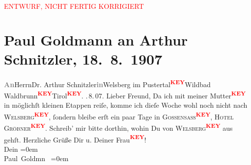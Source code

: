
\begin{center}
            \textcolor{red}{ENTWURF, NICHT FERTIG KORRIGIERT}
                      \end{center}
            
         \renewcommand{\erwaehnteOrte}{Orte: Berlin, Wien}
         \renewcommand{\erwaehnteWerke}{}
               \section[Paul Goldmann an Arthur Schnitzler, 18. 8. 1907]{ Paul Goldmann an Arthur Schnitzler, 18. 8. 1907}\nopagebreak{}\rehead{ }\begin{ledgroupsized}[t]{13cm}\normalsize\beginnumbering \toendnotes[C]{\smallbreak\pagebreak[2]} 
\pstart
           \noindent{}{\pb}\pstart{}\textcolor{gray}{\textbf{ An}}\pend{}\pstart{}Herrn\pend{}\pstart{}Dr. Arthur Schnitzler\pend{}\pstart{}\textcolor{gray}{\textbf{in}}Welsberg im Pustertal\textcolor{red}{\textsuperscript{\textbf{KEY}}}\pend{}\pstart{}Wildbad Waldbrunn\textcolor{red}{\textsuperscript{\textbf{KEY}}}\pend{}\pstart{}Tirol\textcolor{red}{\textsuperscript{\textbf{KEY}}}.\pend{}{\pb}\pend
           \pstart
           . 8. 07.\pend
           Lieber Freund, Da ich mit meiner Mutter\textcolor{red}{\textsuperscript{\textbf{KEY}}} in möglichſt kleinen Etappen reiſe, komme ich dieſe Woche wohl noch
               nicht nach \textsc{Welsberg\textcolor{red}{\textsuperscript{\textbf{KEY}}}}, ſondern bleibe erſt ein paar Tage in \textsc{Gossensass\textcolor{red}{\textsuperscript{\textbf{KEY}}}}, \textsc{Hotel Gröbner\textcolor{red}{\textsuperscript{\textbf{KEY}}}}. Schreib’ mir bitte dorthin, wohin Du von \textsc{Welsberg\textcolor{red}{\textsuperscript{\textbf{KEY}}}} aus gehſt. Herzliche Grüße Dir u. Deiner Frau\textcolor{red}{\textsuperscript{\textbf{KEY}}}!
               {\\[\baselineskip]}Dein\pend
           \leftskip=0em{}\pstart
           {\\[\baselineskip]}\spacefill\mbox{Paul Goldmn }\pend
           \leftskip=0em{}
         
         \endnumbering{}\end{ledgroupsized}\begin{anhang}\end{anhang}\newcommand{\dateiname}{L03257}\newcommand{\titel}{Paul Goldmann an Arthur Schnitzler, 18. 8. 1907}\newcommand{\editorInnen}{Martin Anton Müller und Laura Untner}
      